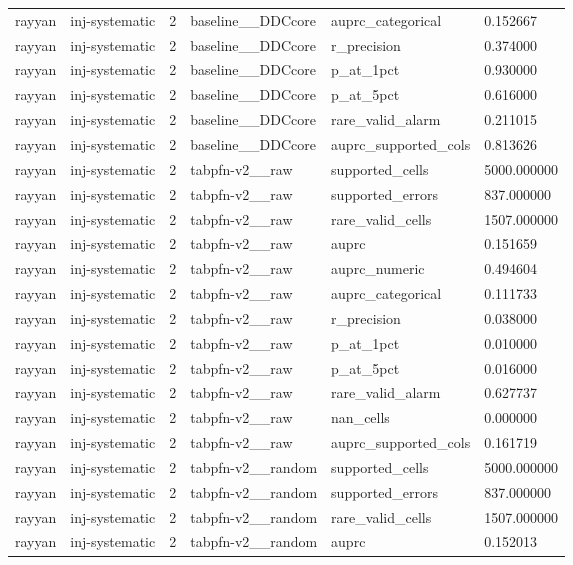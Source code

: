 \begin{tabular}{llllll}
rayyan & inj-systematic & 2 & baseline\_\_DDCcore & auprc\_categorical & 0.152667 \\
rayyan & inj-systematic & 2 & baseline\_\_DDCcore & r\_precision & 0.374000 \\
rayyan & inj-systematic & 2 & baseline\_\_DDCcore & p\_at\_1pct & 0.930000 \\
rayyan & inj-systematic & 2 & baseline\_\_DDCcore & p\_at\_5pct & 0.616000 \\
rayyan & inj-systematic & 2 & baseline\_\_DDCcore & rare\_valid\_alarm & 0.211015 \\
rayyan & inj-systematic & 2 & baseline\_\_DDCcore & auprc\_supported\_cols & 0.813626 \\
rayyan & inj-systematic & 2 & tabpfn-v2\_\_raw & supported\_cells & 5000.000000 \\
rayyan & inj-systematic & 2 & tabpfn-v2\_\_raw & supported\_errors & 837.000000 \\
rayyan & inj-systematic & 2 & tabpfn-v2\_\_raw & rare\_valid\_cells & 1507.000000 \\
rayyan & inj-systematic & 2 & tabpfn-v2\_\_raw & auprc & 0.151659 \\
rayyan & inj-systematic & 2 & tabpfn-v2\_\_raw & auprc\_numeric & 0.494604 \\
rayyan & inj-systematic & 2 & tabpfn-v2\_\_raw & auprc\_categorical & 0.111733 \\
rayyan & inj-systematic & 2 & tabpfn-v2\_\_raw & r\_precision & 0.038000 \\
rayyan & inj-systematic & 2 & tabpfn-v2\_\_raw & p\_at\_1pct & 0.010000 \\
rayyan & inj-systematic & 2 & tabpfn-v2\_\_raw & p\_at\_5pct & 0.016000 \\
rayyan & inj-systematic & 2 & tabpfn-v2\_\_raw & rare\_valid\_alarm & 0.627737 \\
rayyan & inj-systematic & 2 & tabpfn-v2\_\_raw & nan\_cells & 0.000000 \\
rayyan & inj-systematic & 2 & tabpfn-v2\_\_raw & auprc\_supported\_cols & 0.161719 \\
rayyan & inj-systematic & 2 & tabpfn-v2\_\_random & supported\_cells & 5000.000000 \\
rayyan & inj-systematic & 2 & tabpfn-v2\_\_random & supported\_errors & 837.000000 \\
rayyan & inj-systematic & 2 & tabpfn-v2\_\_random & rare\_valid\_cells & 1507.000000 \\
rayyan & inj-systematic & 2 & tabpfn-v2\_\_random & auprc & 0.152013 \\

\end{tabular}
